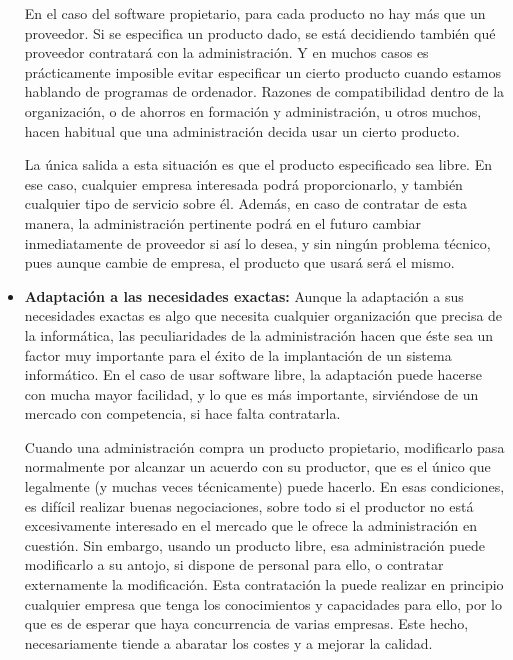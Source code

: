\begin{itemize}
En el caso del software propietario, para cada producto no hay más que un proveedor. Si se especifica un producto dado, se está decidiendo también qué proveedor contratará con la administración. Y en muchos casos es prácticamente imposible evitar especificar un cierto producto cuando estamos hablando de programas de ordenador. Razones de compatibilidad dentro de la organización, o de ahorros en formación y administración, u otros muchos, hacen habitual que una administración decida usar un cierto producto.

La única salida a esta situación es que el producto especificado sea libre. En ese caso, cualquier empresa interesada podrá proporcionarlo, y también cualquier tipo de servicio sobre él. Además, en caso de contratar de esta manera, la administración pertinente podrá en el futuro cambiar inmediatamente de proveedor si así lo desea, y sin ningún problema técnico, pues aunque cambie de empresa, el producto que usará será el mismo.

\item \textbf{Adaptación a las necesidades exactas:} Aunque la adaptación a sus necesidades exactas es algo que necesita cualquier organización que precisa de la informática, las peculiaridades de la administración hacen que éste sea un factor muy importante para el éxito de la implantación de un sistema informático. En el caso de usar software libre, la adaptación puede hacerse con mucha mayor facilidad, y lo que es más importante, sirviéndose de un mercado con competencia, si hace falta contratarla.

Cuando una administración compra un producto propietario, modificarlo pasa normalmente por alcanzar un acuerdo con su productor, que es el único que legalmente (y muchas veces técnicamente) puede hacerlo. En esas condiciones, es difícil realizar buenas negociaciones, sobre todo si el productor no está  excesivamente interesado en el mercado que le ofrece la administración en cuestión. Sin embargo, usando un producto libre, esa administración puede modificarlo a su antojo, si dispone de personal para ello, o contratar externamente la modificación. Esta contratación la puede realizar en principio cualquier empresa que tenga los conocimientos y capacidades para ello, por lo que es de esperar que haya concurrencia de varias empresas. Este hecho, necesariamente tiende a abaratar los costes y a mejorar la calidad.


\end{itemize}
